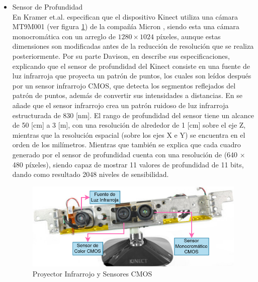             \begin{itemize}
                \item Sensor de Profundidad \\
                En \cite{kramer_hacking_2012} Kramer et.al. especifican que el dispositivo Kinect utiliza una cámara MT9M001 (ver figura \ref{fig:Kinect_Sensors}) de la compañía Micron \cite{micron_12-inch_2004}, siendo esta una cámara monocromática con un arreglo de $1280\times1024$ píxeles, aunque estas dimensiones son modificadas antes de la reducción de resolución que se realiza posteriormente.
                Por su parte Davison, en \cite{davison_kinect_2012} describe sus especificaciones, explicando que el sensor de profundidad del Kinect consiste en una fuente de luz infrarroja que proyecta un patrón de puntos, los cuales son leídos después por un sensor infrarrojo CMOS, que detecta los segmentos reflejados del patrón de puntos, además de convertir sus intensidades a distancias. En  \cite{kramer_hacking_2012} se añade que el sensor infrarrojo crea un patrón ruidoso de luz infrarroja estructurada de 830 [nm]. El rango de profundidad del sensor tiene un alcance de 50 [cm] a 3 [m], con una resolución de alrededor de 1 [cm] sobre el eje Z, mientras que la resolución espacial (sobre los ejes X e Y) se encuentra en el orden de los milímetros. Mientras que \cite{davison_kinect_2012} también se explica que cada cuadro generado por el sensor de profundidad cuenta con una resolución de (640 $\times$ 480 píxeles), siendo capaz de mostrar 11 valores de profundidad de 11 bits, dando como resultado 2048 niveles de sensibilidad.

                \begin{figure}[ht]
                    \centering
                    \includegraphics[scale=0.35]{Figures/Kinect_open.png}
                    \caption{Proyector Infrarrojo y Sensores CMOS \cite{eetimes_inside_2010}}
                    \label{fig:Kinect_Sensors}
                \end{figure}



\end{itemize}
